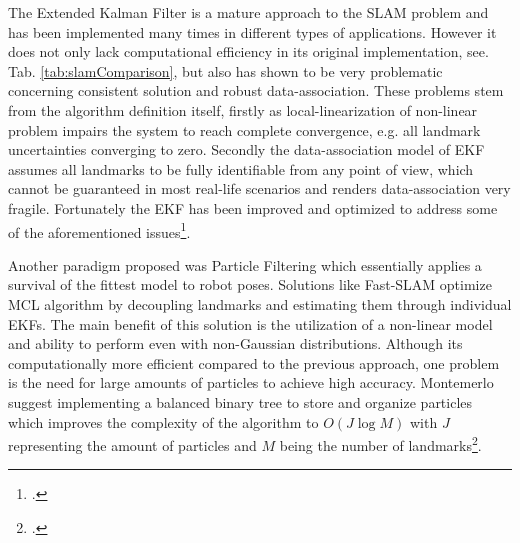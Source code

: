 



The Extended Kalman Filter is a mature approach to the SLAM problem and has been implemented many times in different types of applications. However it does not only lack computational efficiency in its original implementation, see. Tab. \ref{tab:slamComparison}, but also has shown to be very problematic concerning consistent solution and robust data-association. 
These problems stem from the algorithm definition itself, firstly as local-linearization of non-linear problem impairs the system to reach complete convergence, e.g. all landmark uncertainties converging to zero. Secondly the data-association model of EKF assumes all landmarks to be fully identifiable from any point of view, which cannot be guaranteed in most real-life scenarios and renders data-association very fragile.
Fortunately the EKF has been improved and optimized to address some of the aforementioned issues\footcite{bailey2006simultaneous}.

Another paradigm proposed was Particle Filtering which essentially applies a survival of the fittest model to robot poses. Solutions like Fast-SLAM optimize MCL algorithm by decoupling landmarks and estimating them through individual EKFs. 
The main benefit of this solution is the utilization of a non-linear model and ability to perform even with non-Gaussian distributions. 
Although its computationally more efficient compared to the previous approach, one problem is the need for large amounts of particles to achieve high accuracy. Montemerlo suggest implementing a balanced binary tree to store and organize particles which improves the complexity of the algorithm to $O(J  \log  M)$ with $J$ representing the amount of particles and $M$ being the number of landmarks\footcite{montemerlo2002fastslam}.

